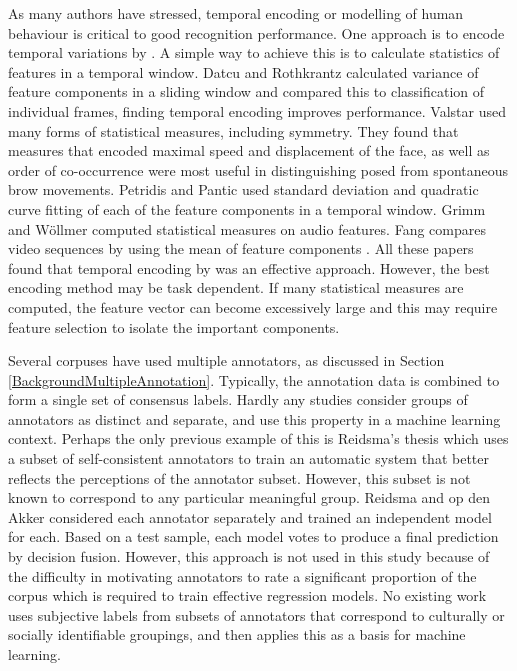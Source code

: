As many authors have stressed, temporal encoding or modelling of human behaviour is critical to good recognition performance. One approach is to encode temporal variations by \featureGeneration. A simple way to achieve this is to calculate statistics of features in a temporal window. 
Datcu and Rothkrantz \cite{Datcu2007} calculated variance of feature components in a sliding window and compared this to classification of individual frames, finding temporal encoding improves performance. Valstar \etal \cite{Valstar2006} used many forms of statistical measures, including symmetry. They found that measures that encoded maximal speed and displacement of the face, as well as order of co-occurrence were most useful in distinguishing posed from spontaneous brow movements. Petridis and Pantic used standard deviation and quadratic curve fitting of each of the feature components \cite{Petridis2008} in a temporal window. Grimm \etal \cite{Grimm2007} and W\"{o}llmer \etal \cite{Wollmer2008} computed statistical measures on audio features. Fang compares video sequences by using the mean of feature components \cite{Fang2009}. All these papers found that temporal encoding by \featureGeneration was an effective approach. However, the best encoding method may be task dependent. If many statistical measures are computed, the feature vector can become excessively large and this may require feature selection to isolate the important components.


Several corpuses have used multiple annotators, as discussed in Section \ref{BackgroundMultipleAnnotation}. Typically, the annotation data is combined to form a single set of consensus labels. Hardly any studies consider groups of annotators as distinct and separate, and use this property in a machine learning context. Perhaps the only previous example of this is Reidsma's thesis \cite{Reidsma2008Thesis} which uses a subset of self-consistent annotators to train an automatic system that better reflects the perceptions of the annotator subset. However, this subset is not known to correspond to any particular meaningful group. Reidsma and op den Akker \cite{Reidsma2008b} considered each annotator separately and trained an independent model for each. Based on a test sample, each model votes to produce a final prediction by decision fusion. However, this approach is not used in this study because of the difficulty in motivating annotators to rate a significant proportion of the corpus which is required to train effective regression models. No existing work uses subjective labels from subsets of annotators that correspond to culturally or socially identifiable groupings, and then applies this as a basis for machine learning.

